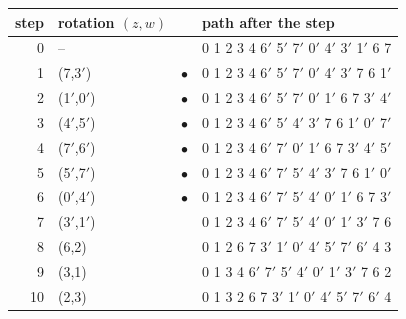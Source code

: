 \documentclass[11pt]{article}
\theoremstyle{definition}
\begin{document}
{\small
\begin{longtable}{@{}r l c l@{}}
\toprule
step & rotation $(z,w)$ & & path after the step \\
\midrule
\endhead
0 & -- &  & 0 1 2 3 4 6$'$ 5$'$ 7$'$ 0$'$ 4$'$ 3$'$ 1$'$ 6 7 \\
1 & (7,3$'$) & $\bullet$ & 0 1 2 3 4 6$'$ 5$'$ 7$'$ 0$'$ 4$'$ 3$'$ 7 6 1$'$ \\
2 & (1$'$,0$'$) & $\bullet$ & 0 1 2 3 4 6$'$ 5$'$ 7$'$ 0$'$ 1$'$ 6 7 3$'$ 4$'$ \\
3 & (4$'$,5$'$) & $\bullet$ & 0 1 2 3 4 6$'$ 5$'$ 4$'$ 3$'$ 7 6 1$'$ 0$'$ 7$'$ \\
4 & (7$'$,6$'$) & $\bullet$ & 0 1 2 3 4 6$'$ 7$'$ 0$'$ 1$'$ 6 7 3$'$ 4$'$ 5$'$ \\
5 & (5$'$,7$'$) & $\bullet$ & 0 1 2 3 4 6$'$ 7$'$ 5$'$ 4$'$ 3$'$ 7 6 1$'$ 0$'$ \\
6 & (0$'$,4$'$) & $\bullet$ & 0 1 2 3 4 6$'$ 7$'$ 5$'$ 4$'$ 0$'$ 1$'$ 6 7 3$'$ \\
7 & (3$'$,1$'$) &  & 0 1 2 3 4 6$'$ 7$'$ 5$'$ 4$'$ 0$'$ 1$'$ 3$'$ 7 6 \\
8 & (6,2) &  & 0 1 2 6 7 3$'$ 1$'$ 0$'$ 4$'$ 5$'$ 7$'$ 6$'$ 4 3 \\
9 & (3,1) &  & 0 1 3 4 6$'$ 7$'$ 5$'$ 4$'$ 0$'$ 1$'$ 3$'$ 7 6 2 \\
10 & (2,3) &  & 0 1 3 2 6 7 3$'$ 1$'$ 0$'$ 4$'$ 5$'$ 7$'$ 6$'$ 4 \\
\bottomrule
\end{longtable}
}
\end{document}
